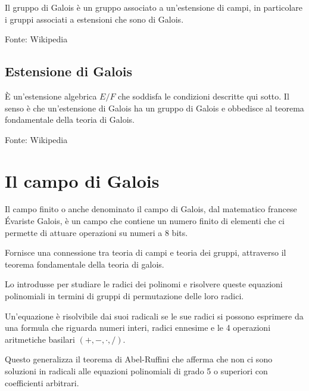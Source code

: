 \textsf{\small Il gruppo di Galois è un gruppo associato a un'estensione di campi, in particolare i gruppi associati a estensioni che sono di Galois.}

\textsf{\small Fonte: Wikipedia \cite{wikipediagruppodigalois}\relax }

\subsection{Estensione di Galois}

 

\textsf{\small È un'estensione algebrica $E/F$ che soddisfa le condizioni descritte qui sotto. Il senso è che un'estensione di Galois ha un gruppo di Galois e obbedisce al teorema fondamentale della teoria di Galois.}

\textsf{\small Fonte: Wikipedia \cite{wikipediaestensionedigalois}\relax }


\section{Il campo di Galois}


\textsf{\small Il campo finito o anche denominato il campo di Galois, dal matematico francese Évariste Galois, è un campo che contiene un numero finito di elementi che ci permette di attuare operazioni su numeri a 8 bits.} %

  

\textsf{\small Fornisce una connessione tra teoria di campi e teoria dei gruppi, attraverso il teorema fondamentale della teoria di galois.} %

\textsf{\small Lo introdusse per studiare le radici dei polinomi e risolvere queste equazioni polinomiali in termini di gruppi di permutazione delle loro radici.}

\textsf{\small Un'equazione è risolvibile dai suoi radicali se le sue radici si possono esprimere da una formula che riguarda numeri interi, radici ennesime e le 4 operazioni aritmetiche basilari $(+, -, \cdot, /)$.}

 

\textsf{\small Questo generalizza il teorema di Abel-Ruffini che afferma che non ci sono soluzioni in radicali alle equazioni polinomiali di grado 5 o superiori con coefficienti arbitrari.} %


